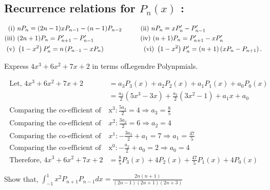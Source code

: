 \subsection{Recurrence relations for $P_{n}(x)$ :}
\begin{align*}
\text{(i) }&n P_{n}=(2 n-1) x P_{n-1}-(n-1) P_{n-2}\hspace{1cm}
\text{(ii) }n P_{n}=x P_{n}^{\prime}-P_{n-1}^{\prime}\\
\text{(iii) }&(2 n+1) P_{n}=P_{n+1}^{\prime}-P_{n-1}^{\prime}\hspace{2.5cm}
\text{(iv) }(n+1) P_{n}=P_{n+1}^{\prime}-x P_{n}^{\prime}\\
\text{(v) }&\left(1-x^{2}\right) P_{n}^{\prime}=n\left(P_{n-1}-x P_{n}\right)\hspace{2.1cm}
\text{(vi) }\left(1-x^{2}\right) P_{n}^{\prime}=(n+1)\left(x P_{n}-P_{n+1}\right).
\end{align*}
\begin{exercise}
	Express $4 x^{3}+6 x^{2}+7 x+2$ in terms ofLegendre Polynpmials.
\end{exercise}
\begin{answer}
	\begin{align*}
	\text { Let, } 4 x^{3}+6 x^{2}+7 x+2&=a_{3} P_{3}(x)+a_{2} P_{2}(x)+a_{1} P_{1}(x)+a_{0} P_{0}(x)\\
	&=\frac{a_{3}}{2}\left(5 x^{3}-3 x\right)+\frac{a_{2}}{2}\left(3 x^{2}-1\right)+a_{1} x+a_{0}\\
	\text { Comparing the co-efficient of } &\mathrm{x}^{3}: \frac{5 a_{3}}{2}=4 \Rightarrow a_{3}=\frac{8}{5}\\
	\text { Comparing the co-efficient of }& x^{2}: \frac{3 a_{2}}{2}=6 \Rightarrow a_{2}=4\\
	\text { Comparing the co-efficient of }& x^{1}:-\frac{3 a_{3}}{2}+a_{1}=7 \Rightarrow a_{1}=\frac{47}{5}\\
	\text { Comparing the co-efficient of }& \mathrm{x}^{0}:-\frac{a_{2}}{2}+a_{0}=2 \Rightarrow a_{0}=4\\
	\text { Therefore, } 4 x^{3}+6 x^{2}+7 x+2&=\frac{8}{5} P_{3}(x)+4 P_{2}(x)+\frac{47}{5} P_{1}(x)+4 P_{0}(x)
	\end{align*}
\end{answer}
\begin{exercise}
	Show that, $\int_{-1}^{1} x^{2} P_{n+1} P_{n-1} d x=\frac{2 n(n+1)}{(2 n-1)(2 n+1)(2 n+3)}$
\end{exercise}
